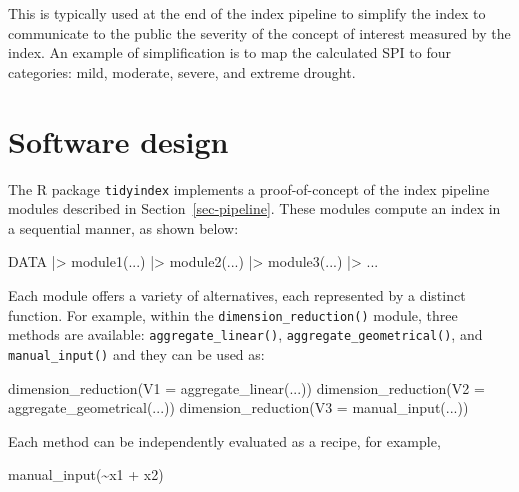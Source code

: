 \documentclass[
]{interact}
\newenvironment{Shaded}{\begin{snugshade}}{\end{snugshade}}
\newcommand{\AttributeTok}[1]{\textcolor[rgb]{0.40,0.45,0.13}{#1}}
\newcommand{\FunctionTok}[1]{\textcolor[rgb]{0.28,0.35,0.67}{#1}}
\newcommand{\NormalTok}[1]{\textcolor[rgb]{0.00,0.23,0.31}{#1}}
\newcommand{\SpecialCharTok}[1]{\textcolor[rgb]{0.37,0.37,0.37}{#1}}
\begin{document}
This is typically used at the end of the index pipeline to simplify the
index to communicate to the public the severity of the concept of
interest measured by the index. An example of simplification is to map
the calculated SPI to four categories: mild, moderate, severe, and
extreme drought.

\hypertarget{sec-software}{%
\section{Software design}\label{sec-software}}

The R package \texttt{tidyindex} implements a proof-of-concept of the
index pipeline modules described in Section~\ref{sec-pipeline}. These
modules compute an index in a sequential manner, as shown below:

\begin{Shaded}
\begin{Highlighting}[]
\NormalTok{DATA }\SpecialCharTok{|\textgreater{}} 
  \FunctionTok{module1}\NormalTok{(...) }\SpecialCharTok{|\textgreater{}}
  \FunctionTok{module2}\NormalTok{(...) }\SpecialCharTok{|\textgreater{}}
  \FunctionTok{module3}\NormalTok{(...) }\SpecialCharTok{|\textgreater{}}
\NormalTok{  ...}
\end{Highlighting}
\end{Shaded}

Each module offers a variety of alternatives, each represented by a
distinct function. For example, within the
\texttt{dimension\_reduction()} module, three methods are available:
\texttt{aggregate\_linear()}, \texttt{aggregate\_geometrical()}, and
\texttt{manual\_input()} and they can be used as:

\begin{Shaded}
\begin{Highlighting}[]
\FunctionTok{dimension\_reduction}\NormalTok{(}\AttributeTok{V1 =} \FunctionTok{aggregate\_linear}\NormalTok{(...))}
\FunctionTok{dimension\_reduction}\NormalTok{(}\AttributeTok{V2 =} \FunctionTok{aggregate\_geometrical}\NormalTok{(...))}
\FunctionTok{dimension\_reduction}\NormalTok{(}\AttributeTok{V3 =} \FunctionTok{manual\_input}\NormalTok{(...))}
\end{Highlighting}
\end{Shaded}

Each method can be independently evaluated as a recipe, for example,

\begin{Shaded}
\begin{Highlighting}[]
\FunctionTok{manual\_input}\NormalTok{(}\SpecialCharTok{\textasciitilde{}}\NormalTok{x1 }\SpecialCharTok{+}\NormalTok{ x2)}
\end{Highlighting}
\end{Shaded}
\end{document}
